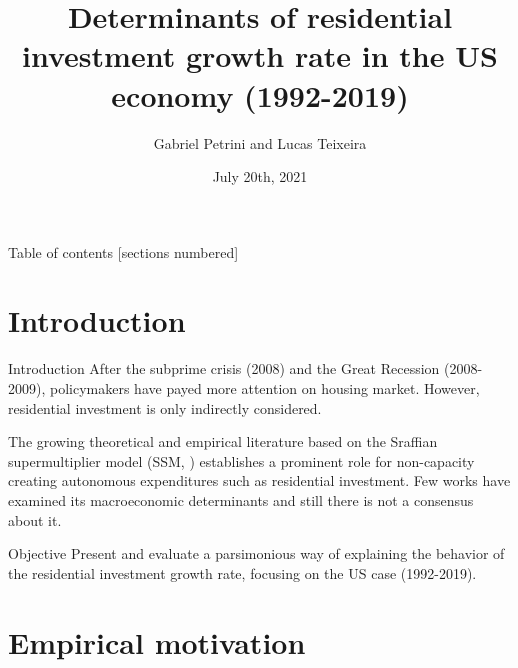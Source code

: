 \documentclass[10pt]{beamer}
\institute{Institute of Economics - University of Campinas/Brazil}
\author{Gabriel Petrini and Lucas Teixeira}
\date{July 20th, 2021}
\title{Determinants of residential investment growth rate in the US economy (1992-2019)}
\begin{document}
\maketitle





\begin{frame}{Table of contents}
  [sections numbered]
  \tableofcontents[hideallsubsections]
\end{frame}

\section{Introduction}
\label{sec:org1d8202a}

\begin{frame}[label={sec:org96d5086}]{Introduction}
After the subprime crisis (2008) and the Great Recession (2008-2009), policymakers have payed more attention on housing market.
However, residential investment is only \alert{indirectly} considered.

The growing theoretical and empirical literature based on the Sraffian supermultiplier model (SSM, \cites{serrano_long_1995}{bortis_institutions_1997}) establishes a prominent role for non-capacity creating autonomous expenditures such as \alert{residential investment}.
Few works have examined its \alert{macroeconomic} determinants and still there is not a consensus about it.


\begin{block}{Objective}
Present and evaluate a parsimonious way of explaining the behavior of the residential investment growth rate, focusing on the US case (1992-2019).
\end{block}
\end{frame}

\section{Empirical motivation}
\label{sec:org8872f58}
\end{document}
